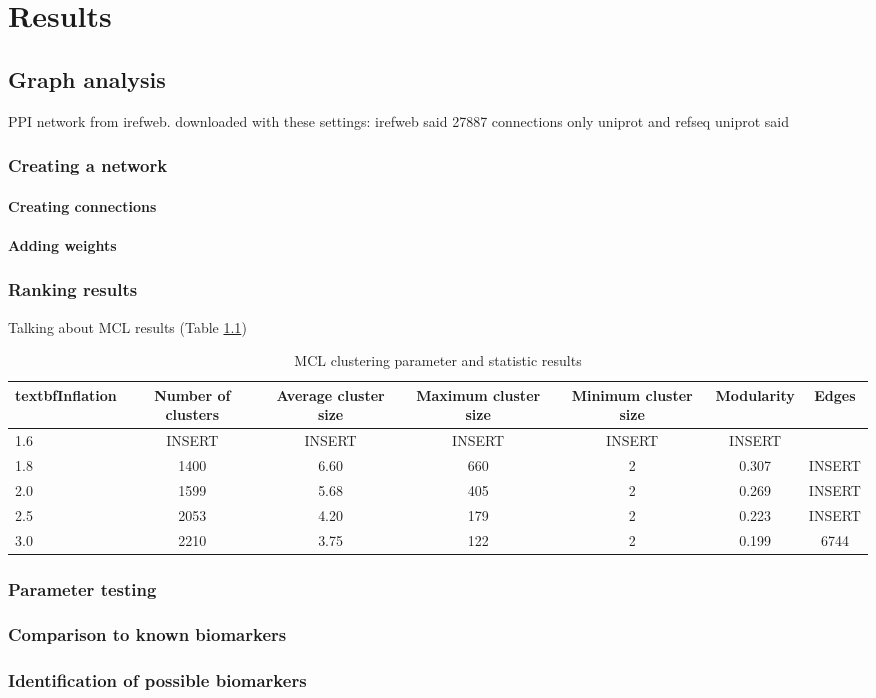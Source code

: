 \part{Results}
\label{pa:results}
\chapter{Graph analysis}
PPI network from irefweb.
downloaded with these settings: %
irefweb said 27887 connections %
only uniprot and refseq
uniprot said
\section{Creating a network}
\subsection{Creating connections}
\subsection{Adding weights}
\section{Ranking results}
Talking about MCL results (Table \ref{tab:mcl-inflation})
\begin{table}
    \centering
    \begin{tabular}{| l | c | c | c | c | c | c |}
        \\textbf{Inflation} & \textbf{Number of clusters} & \textbf{Average
    cluster size} & \textbf{Maximum cluster size} & \textbf{Minimum cluster
    size} & \textbf{Modularity} & \textbf{Edges}\\
        \hline
        1.6 & INSERT & INSERT & INSERT & INSERT & INSERT \\
        1.8 & 1400 & 6.60 & 660 & 2 & 0.307 & INSERT \\
        2.0 & 1599 & 5.68 & 405 & 2 & 0.269 & INSERT \\
        2.5 & 2053 & 4.20 & 179 & 2 & 0.223 & INSERT \\
        3.0 & 2210 & 3.75 & 122 & 2 & 0.199 & 6744 \\
        \hline
    \end{tabular}
    \caption{MCL clustering parameter and statistic results}
    \label{tab:mcl-inflation}
\end{table}
\section{Parameter testing}
\section{Comparison to known biomarkers}
\section{Identification of possible biomarkers}
